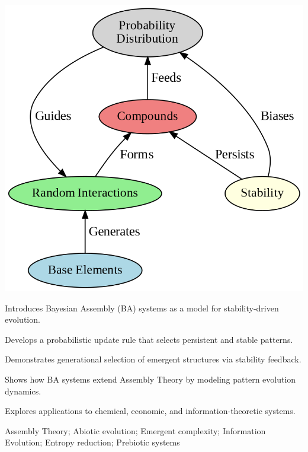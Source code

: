 \documentclass[preprint,12pt]{elsarticle}
\begin{document}
\begin{frontmatter}
\begin{graphicalabstract}
\includegraphics[width=1\textwidth]{figure_10}
\end{graphicalabstract}

\begin{highlights}
\item Introduces Bayesian Assembly (BA) systems as a model for stability-driven evolution.
\item Develops a probabilistic update rule that selects persistent and stable patterns.
\item Demonstrates generational selection of emergent structures via stability feedback.
\item Shows how BA systems extend Assembly Theory by modeling pattern evolution dynamics.
\item Explores applications to chemical, economic, and information-theoretic systems.
\end{highlights}

\begin{keyword}
Assembly Theory; Abiotic evolution; Emergent complexity; Information Evolution; Entropy reduction; Prebiotic systems



\end{keyword}

\end{frontmatter}
\end{document}
